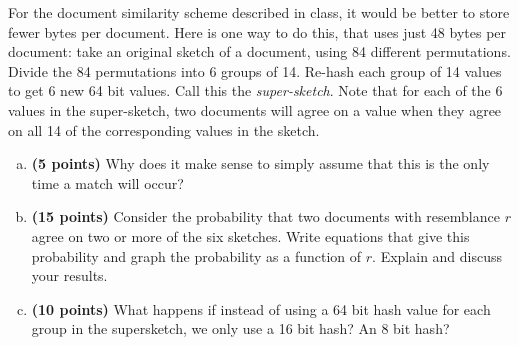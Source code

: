\documentclass[11pt,letterpaper]{article}
\begin{document}
\pagebreak
\begin{problem}
    For the document similarity scheme described in class, it would be better to store fewer bytes per document.  Here is one way to do this, that uses just 48 bytes per document: take an original sketch of a document, using 84 different permutations.  Divide the 84 permutations into 6 groups of 14.  Re-hash each group of 14 values to get 6 new 64 bit values.  Call this the {\em super-sketch}.  Note that for each of the 6 values in the super-sketch, two documents will agree on a value when they agree on all 14 of the corresponding values in the sketch. 
    \begin{enumerate}[(a)]
        \item {\bf (5 points)} Why does it make sense to simply assume that this is the only time a match will occur?
        \item {\bf (15 points)} Consider the probability that two documents with resemblance $r$ agree on two or more of the six sketches.  Write equations that give this probability and graph the probability as a function of $r$. Explain and discuss your results.
        \item {\bf (10 points)} What happens if instead of using a 64 bit hash value for each group in the supersketch, we only use a 16 bit hash?  An 8 bit hash?
    \end{enumerate}
\end{problem}
\end{document}
